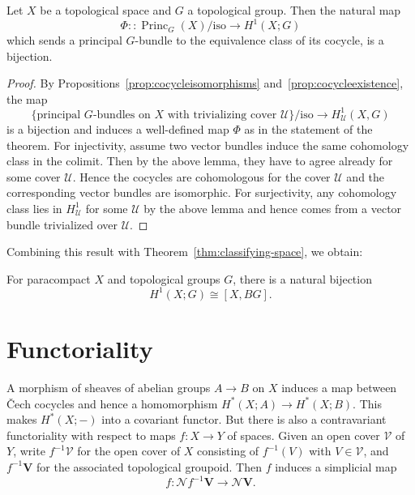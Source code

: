 \documentclass[a4paper,openany]{scrbook}
\DeclareMathOperator{\Princ}{Princ}
\newcommand{\nerve}{\mathcal N}
\begin{document}
\begin{thm}\label{thm:principalbundlesbycechcohomology}
Let $X$ be a topological space and $G$ a topological group. Then the natural map
\[
\Phi\colon\colon \Princ_G(X)/\text{iso} \to H^1(X;G)
\]
which sends a principal $G$-bundle to the equivalence class of its cocycle, is a bijection.
\end{thm}
\begin{proof}
By Propositions~\ref{prop:cocycleisomorphisms} and~\ref{prop:cocycleexistence}, the map
\[
\{\text{principal $G$-bundles on $X$ with trivializing cover $\mathcal U$}\}/\text{iso} \to H_\mathcal U^1(X,G)
\]
is a bijection and induces a well-defined map $\Phi$ as in the statement of the theorem. For injectivity, assume two vector bundles induce the same cohomology class in the colimit. Then by the above lemma, they have to agree already for some cover $\mathcal U$. Hence the cocycles are cohomologous for the cover $\mathcal U$ and the corresponding vector bundles are isomorphic. For surjectivity, any cohomology class lies in $H^1_{\mathcal U}$ for some $\mathcal U$ by the above lemma and hence comes from a vector bundle trivialized over $\mathcal U$.
\end{proof}

Combining this result with Theorem~\ref{thm:classifying-space}, we obtain:

\begin{corollary}\label{cor:H1representable}
For paracompact $X$ and topological groups $G$, there is a natural bijection
\[
H^1(X;G) \cong [X,BG].
\]
\end{corollary}

\section{Functoriality}

A morphism of sheaves of abelian groups $A \to B$ on $X$ induces a map between \v Cech cocycles and hence a homomorphism $H^*(X;A) \to H^*(X;B)$. This makes $H^*(X;-)$ into a covariant functor. But there is also a contravariant functoriality with respect to maps $f\colon X \to Y$ of spaces. Given an open cover $\mathcal V$ of $Y$, write $f^{-1}\mathcal V$ for the open cover of $X$ consisting of $f^{-1}(V)$ with $V \in \mathcal V$, and $f^{-1}\mathbf V$ for the associated topological groupoid. Then $f$ induces a simplicial map
\[
f\colon\nerve f^{-1}\mathbf V \to \nerve \mathbf V.
\]
\end{document}
